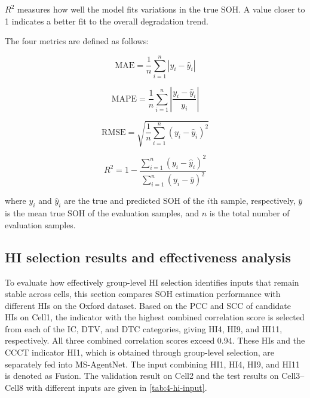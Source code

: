 $R^2$ measures how well the model fits variations in the true SOH. A value closer to 1 indicates a better fit to the overall degradation trend.

The four metrics are defined as follows:

\begin{equation}
\label{eq:metric_mae}
\mathrm{MAE}=\frac{1}{n}\sum_{i=1}^{n}\left|y_i-\hat{y}_i\right|
\end{equation}

\begin{equation}
\label{eq:metric_mape}
\mathrm{MAPE}=\frac{1}{n}\sum_{i=1}^{n}\left|\frac{y_i-\hat{y}_i}{y_i}\right|
\end{equation}

\begin{equation}
\label{eq:metric_rmse}
\mathrm{RMSE}=\sqrt{\frac{1}{n}\sum_{i=1}^{n}\left(y_i-\hat{y}_i\right)^2}
\end{equation}

\begin{equation}
\label{eq:metric_r2}
R^2=1-\frac{\sum_{i=1}^{n}\left(y_i-\hat{y}_i\right)^2}{\sum_{i=1}^{n}\left(y_i-\bar{y}\right)^2}
\end{equation}

where $y_i$ and $\hat{y}_i$ are the true and predicted SOH of the $i$th sample, respectively, $\bar{y}$ is the mean true SOH of the evaluation samples, and $n$ is the total number of evaluation samples.

\subsection{HI selection results and effectiveness analysis}

To evaluate how effectively group-level HI selection identifies inputs that remain stable across cells, this section compares SOH estimation performance with different HIs on the Oxford dataset. Based on the PCC and SCC of candidate HIs on Cell1, the indicator with the highest combined correlation score is selected from each of the IC, DTV, and DTC categories, giving HI4, HI9, and HI11, respectively. All three combined correlation scores exceed 0.94. These HIs and the CCCT indicator HI1, which is obtained through group-level selection, are separately fed into MS-AgentNet. The input combining HI1, HI4, HI9, and HI11 is denoted as Fusion. The validation result on Cell2 and the test results on Cell3--Cell8 with different inputs are given in \cref{tab:4-hi-input}.

